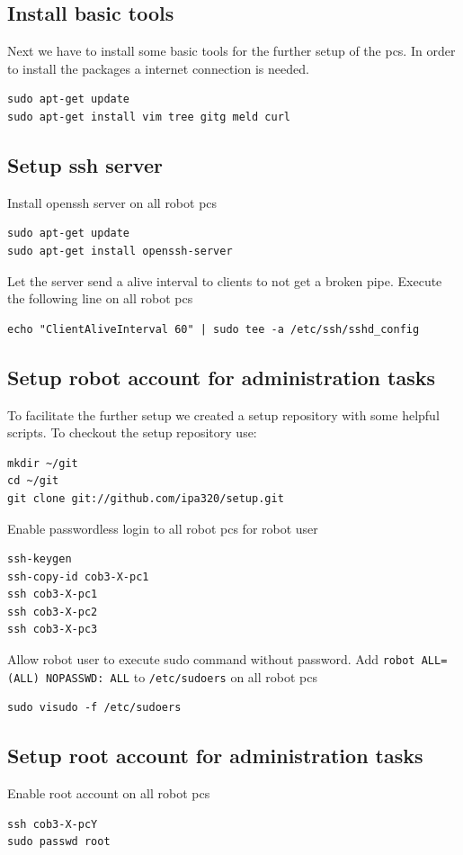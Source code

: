 \subsection{Install basic tools}
Next we have to install some basic tools for the further setup of the pcs. In order to install the packages a internet connection is needed.

\begin{lstlisting}
sudo apt-get update
sudo apt-get install vim tree gitg meld curl
\end{lstlisting}

\subsection{Setup ssh server}
Install openssh server on all robot pcs
\begin{lstlisting}
sudo apt-get update
sudo apt-get install openssh-server
\end{lstlisting}
Let the server send a alive interval to clients to not get a broken pipe. Execute the following line on all robot pcs
\begin{lstlisting}
echo "ClientAliveInterval 60" | sudo tee -a /etc/ssh/sshd_config
\end{lstlisting}

\subsection{Setup robot account for administration tasks}
To facilitate the further setup we created a setup repository with some helpful scripts. To checkout the setup repository use:

\begin{lstlisting}
mkdir ~/git
cd ~/git
git clone git://github.com/ipa320/setup.git
\end{lstlisting}

Enable passwordless login to all robot pcs for robot user
\begin{lstlisting}
ssh-keygen
ssh-copy-id cob3-X-pc1
ssh cob3-X-pc1
ssh cob3-X-pc2
ssh cob3-X-pc3
\end{lstlisting}

Allow robot user to execute sudo command without password. Add \texttt{robot ALL=(ALL) NOPASSWD: ALL} to \texttt{/etc/sudoers} on all robot pcs
\begin{lstlisting}
sudo visudo -f /etc/sudoers
\end{lstlisting}

\subsection{Setup root account for administration tasks} \label{sec:root_user}
Enable root account on all robot pcs
\begin{lstlisting}
ssh cob3-X-pcY
sudo passwd root
\end{lstlisting}

